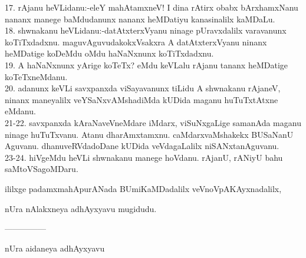 \documentclass{article}
\begin{document}
17. rAjanu heVLidanu:-eleY mahAtamxneV! I dina rAtirx obabx bArxhamxNanu nananx manege baMdudanunx nananx heMDatiyu kanasinalilx kaMDaLu.\\
18. shwnakanu heVLidanu:-datAtxterxVyanu ninage pUravxdalilx varavanunx koTiTxdadxnu. maguvAguvudakokxVsakxra A datAtxterxVyanu ninanx heMDatige koDeMdu oMdu haNaNxnunx koTiTxdadxnu.\\
19. A haNaNxnunx yArige koTeTx? eMdu keVLalu rAjanu tananx heMDatige koTeTxneMdanu.\\
20. adanunx keVLi savxpanxda viSayavanunx tiLidu A shwnakanu rAjaneV, ninanx maneyalilx veYSaNxvAMshadiMda kUDida maganu huTuTxtAtxne eMdanu.\\
21-22. savxpanxda kAraNaveVneMdare iMdarx, viSuNxgaLige samanAda maganu ninage huTuTxvanu. Atanu dharAmxtamxnu. caMdarxvaMshakekx BUSaNanU Aguvanu. dhanuveRVdadoDane kUDida veVdagaLalilx niSANxtanAguvanu.\\
23-24. hiVgeMdu heVLi shwnakanu manege hoVdanu. rAjanU, rANiyU bahu saMtoVSagoMDaru.

\begin{center}
ililxge padamxmahApurANada BUmiKaMDadalilx veVnoVpAKAyxnadalilx,
\end{center}

\begin{center}
nUra nAlakxneya adhAyxyavu mugidudu.
\end{center}

\begin{center}
---------------
\end{center}

\begin{center}
nUra aidaneya adhAyxyavu
\end{center}
\end{document}
